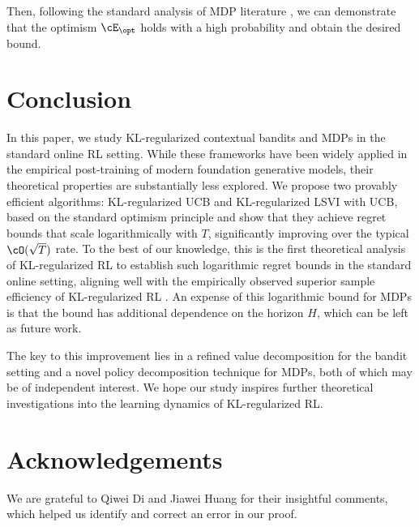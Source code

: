 \documentclass[11pt]{article}
\begin{document}
Then, following the standard analysis of MDP literature \citep{zhang2023mathematical}, we can demonstrate that the optimism $\cE_\opt$ holds with a high probability and obtain the desired bound.

\section{Conclusion}
In this paper, we study KL-regularized contextual bandits and MDPs in the standard online RL setting. While these frameworks have been widely applied in the empirical post-training of modern foundation generative models, their theoretical properties are substantially less explored. We propose two provably efficient algorithms: KL-regularized UCB and KL-regularized LSVI with UCB, based on the standard optimism principle and show that they achieve regret bounds that scale logarithmically with $T$, significantly improving over the typical $\cO(\sqrt{T})$ rate. To the best of our knowledge, this is the first theoretical analysis of KL-regularized RL to establish such logarithmic regret bounds in the standard online setting, aligning well with the empirically observed superior sample efficiency of KL-regularized RL \citep{bai2022training, deepseekai2025deepseekr1incentivizingreasoningcapability}. An expense of this logarithmic bound for MDPs is that the bound has additional dependence on the horizon $H$, which can be left as future work.

The key to this improvement lies in a refined value decomposition for the bandit setting and a novel policy decomposition technique for MDPs, both of which may be of independent interest. We hope our study inspires further theoretical investigations into the learning dynamics of KL-regularized RL.

\section*{Acknowledgements}

We are grateful to Qiwei Di and Jiawei Huang for their insightful comments, which helped us identify and correct an error in our proof.




\newpage
\appendix
\end{document}
